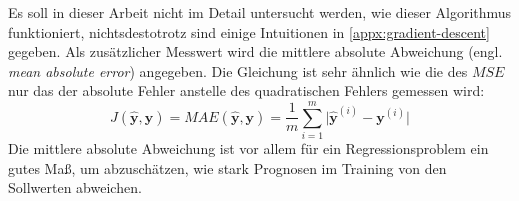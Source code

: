 Es soll in dieser Arbeit nicht im Detail untersucht werden, wie dieser
Algorithmus funktioniert, nichtsdestotrotz sind einige Intuitionen
in \autoref{appx:gradient-descent} gegeben.
Als zusätzlicher Messwert wird die mittlere absolute Abweichung
(engl. \textit{mean absolute error}) angegeben.
Die Gleichung ist sehr ähnlich wie die des $MSE$ nur das der absolute Fehler
anstelle des quadratischen Fehlers gemessen wird:
\begin{equation}
  J(\mathbf{\hat{y}}, \mathbf{y}) =
  MAE(\mathbf{\hat{y}}, \mathbf{y}) =
    \frac{1}{m} \sum_{i=1}^{m} \vert\mathbf{\hat{y}}^{(i)} - \mathbf{y}^{(i)}\vert
  \label{eq:mae}
\end{equation}
Die mittlere absolute Abweichung ist vor allem für ein Regressionsproblem
ein gutes Maß, um abzuschätzen, wie stark Prognosen im Training von
den Sollwerten abweichen.

